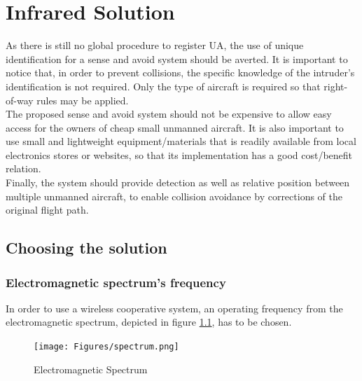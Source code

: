 
\chapter{Infrared Solution}
\label{chapter:active}
As there is still no global procedure to register UA, the use of unique identification for a sense and avoid system should be averted. It is important to notice that, in order to prevent collisions, the specific knowledge of the intruder's identification is not required. Only the type of aircraft is required so that right-of-way rules may be applied.\\
The proposed sense and avoid system should not be expensive to allow easy access for the owners of cheap small unmanned aircraft. It is also important to use small and lightweight equipment/materials that is readily available from local electronics stores or websites, so that its implementation has a good cost/benefit relation.\\
Finally, the system should provide detection as well as relative position between multiple unmanned aircraft, to enable collision avoidance by corrections of the original flight path.\\

\section{Choosing the solution}
\label{section:choosing}
\subsection{Electromagnetic spectrum's frequency}
\label{subsection:eospectrum}
In order to use a wireless cooperative system, an operating frequency from the electromagnetic spectrum, depicted in figure \ref{fig:spectrum}, has to be chosen.
\begin{figure}[!htb]
  \centering
  \texttt{[image: Figures/spectrum.png]}
  \caption[Electromagnetic Spectrum \citep{Haynes}]{Electromagnetic Spectrum \citep{Haynes}}
  \label{fig:spectrum}
\end{figure}
